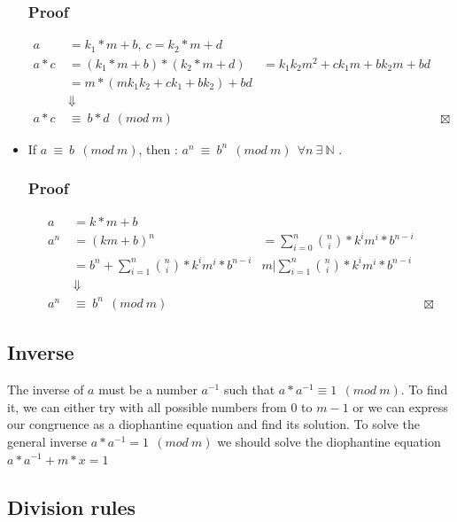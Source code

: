 \documentclass[11pt,twoside]{article}
\theoremstyle{defi}
\begin{document}
\begin{itemize}
\subsubsection{Proof}
\begin{align*}
a &= k_1*m + b,\ c = k_2*m+d \\
a * c &= (k_1*m + b)*(k_2*m +d) &= k_1k_2m^2+ck_1m+bk_2m+bd \\ 
	  &= m*(mk_1k_2 + ck_1 + bk_2) + bd\\
& \Downarrow \\
a*c\ &\equiv\ b*d\ \ (mod\ m)
&&\boxtimes
\end{align*}

\item If $a\ \equiv\ b\ \ (mod\ m)$, then : $a^n\ \equiv\ b^n\ \ (mod\ m)\ \ \forall n\ \exists\ \mathbb{N}$ .
\subsubsection{Proof}
\begin{align*}
a &= k*m + b\\
a^n &= (km + b)^n &= \sum_{i=0}^n \binom{n}{i}*k^im^i*b^{n-i} \\
&= b^n+\sum_{i=1}^n \binom{n}{i}*k^im^i*b^{n-i} & m|\sum_{i=1}^n \binom{n}{i}*k^im^i*b^{n-i}\\
& \Downarrow \\
a^n\ &\equiv\ b^n\ \ (mod\ m)
&&\boxtimes
\end{align*}

\end{itemize}

\subsection{Inverse}\label{Inverse}

The inverse of $a$ must be a number $a^{-1}$ such that $a*a^{-1} \equiv 1\ \ (mod\ m)$. To find it, we can either try with all possible numbers from 0 to $m-1$ or we can express our congruence as a diophantine equation and find its solution. To solve the general inverse $a*a^{-1} = 1\ \ (mod\ m)$ we should solve the diophantine equation $a*a^{-1} + m*x =  1$

\subsection{Division rules}
\end{document}
